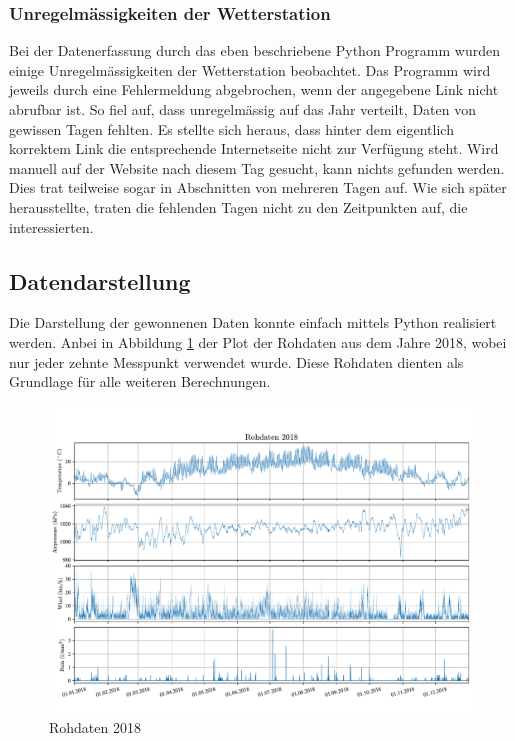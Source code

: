 \begin{refsection}
\subsubsection{Unregelmässigkeiten der Wetterstation}
Bei der Datenerfassung durch das eben beschriebene Python Programm wurden einige Unregelmässigkeiten der Wetterstation beobachtet.
Das Programm wird jeweils durch eine Fehlermeldung abgebrochen, wenn der angegebene Link nicht abrufbar ist. 
So fiel auf, dass unregelmässig auf das Jahr verteilt, Daten von gewissen Tagen fehlten. Es stellte sich heraus, dass hinter dem eigentlich korrektem Link die entsprechende Internetseite nicht zur Verfügung steht.
Wird manuell auf der Website nach diesem Tag gesucht, kann nichts gefunden werden.
Dies trat teilweise sogar in Abschnitten von mehreren Tagen auf.
Wie sich später herausstellte, traten die fehlenden Tagen nicht zu den Zeitpunkten auf, die interessierten.


\subsection{Datendarstellung}
Die Darstellung der gewonnenen Daten konnte einfach mittels Python realisiert werden.
Anbei in Abbildung \ref{fig:rawdata} der Plot der Rohdaten aus dem Jahre 2018, wobei nur jeder zehnte Messpunkt verwendet wurde.
Diese Rohdaten dienten als Grundlage für alle weiteren Berechnungen. 
\begin{figure}
	\centering
	\includegraphics[width=1\textwidth]{papers/wwt/images/raw.pdf}
	\caption{Rohdaten 2018}
	\label{fig:rawdata}
\end{figure}



\end{refsection}
